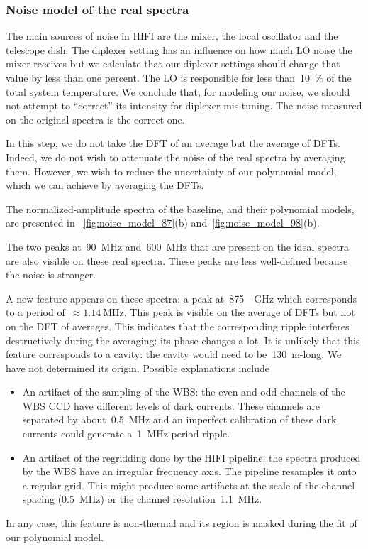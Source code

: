 \subsubsection{Noise model of the real spectra}
\label{sec:noise_model_of_the_real_spectra}

The main sources of noise in HIFI are the mixer, the local oscillator and the telescope dish.
The diplexer setting has an influence on how much LO noise the mixer receives but we calculate that our diplexer settings should change that value by less than one percent.
The LO is responsible for less than~\SI{10}{\percent} of the total system temperature.
We conclude that, for modeling our noise, we should not attempt to ``correct'' its intensity for diplexer mis-tuning.
The noise measured on the original spectra is the correct one.

In this step, we do not take the DFT of an average but the average of DFTs.
Indeed, we do not wish to attenuate the noise of the real spectra by averaging them.
However, we wish to reduce the uncertainty of our polynomial model, which we can achieve by averaging the DFTs.

The normalized-amplitude spectra of the baseline, and their polynomial models, are presented in~%
\cref{fig:noise_model_87}(b) and~\cref{fig:noise_model_98}(b).

The two peaks at~\SI{90}{\mega\hertz} and~\SI{600}{\mega\hertz} that are present on the ideal spectra are also visible on these real spectra.
These peaks are less well-defined because the noise is stronger.

A new feature appears on these spectra: a peak at~\SI{875}{\per\giga\hertz} which corresponds to a period of~$\approx\SI{1.14}{\mega\hertz}$.
This peak is visible on the average of DFTs but not on the DFT of averages.
This indicates that the corresponding ripple interferes destructively during the averaging: its phase changes a lot.
It is unlikely that this feature corresponds to a cavity: the cavity would need to be~\SI{130}{\meter}-long.
We have not determined its origin.
Possible explanations include
\begin{itemize}[noitemsep,nolistsep]
    \item An artifact of the sampling of the WBS:
the even and odd channels of the WBS CCD have different levels of dark currents.
These channels are separated by about~\SI{0.5}{\mega\hertz} and an imperfect calibration of these dark currents could generate a~\SI{1}{\mega\hertz}-period ripple.
    \item An artifact of the regridding done by the HIFI pipeline:
the spectra produced by the WBS have an irregular frequency axis.
The pipeline resamples it onto a regular grid.
This might produce some artifacts at the scale of the channel spacing (\SI{0.5}{\mega\hertz}) or the channel resolution~\SI{1.1}{\mega\hertz}.
\end{itemize}
In any case, this feature is non-thermal and its region is masked during the fit of our polynomial model.

